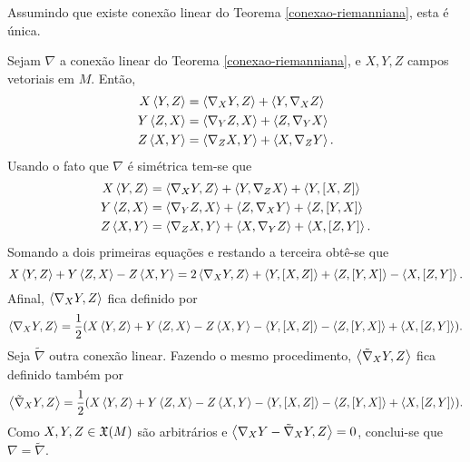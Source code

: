 \begin{lema}\label{conexao-riemanniana-lema-1}
	Assumindo que existe conexão linear do Teorema \ref{conexao-riemanniana}, esta é única.
\end{lema}

\begin{demonstracao}
	Sejam $\nabla$ a conexão linear do Teorema \ref{conexao-riemanniana}, e $X,Y,Z$ campos vetoriais em $M$. Então,
	\begin{align*}
		X \left\langle Y,Z \right\rangle &= \left\langle \nabla_X Y,Z \right\rangle + \left\langle Y,\nabla_X Z \right\rangle\\
		Y \left\langle Z,X \right\rangle &= \left\langle \nabla_Y Z,X \right\rangle + \left\langle Z,\nabla_Y X \right\rangle\\
		Z \left\langle X,Y \right\rangle &= \left\langle \nabla_Z X,Y \right\rangle + \left\langle X,\nabla_Z Y \right\rangle.
	\end{align*}
	Usando o fato que $\nabla$ é simétrica tem-se que
	\begin{align*}
	X \left\langle Y,Z \right\rangle &= \left\langle \nabla_X Y,Z \right\rangle + \left\langle Y,\nabla_Z X \right\rangle + \left\langle Y,\left[ X, Z \right] \right\rangle\\
	Y \left\langle Z,X \right\rangle &= \left\langle \nabla_Y Z,X \right\rangle + \left\langle Z,\nabla_X Y \right\rangle + \left\langle Z,\left[ Y, X \right] \right\rangle\\
	Z \left\langle X,Y \right\rangle &= \left\langle \nabla_Z X,Y \right\rangle + \left\langle X,\nabla_Y Z \right\rangle + \left\langle X,\left[ Z, Y \right] \right\rangle.
	\end{align*}
	Somando a dois primeiras equações e restando a terceira obtê-se que
	\begin{equation*}
		X \left\langle Y,Z \right\rangle + Y \left\langle Z,X \right\rangle - Z \left\langle X,Y \right\rangle = 2 \left\langle \nabla_X Y,Z \right\rangle + \left\langle Y,\left[ X, Z \right] \right\rangle + \left\langle Z,\left[ Y, X \right] \right\rangle - \left\langle X,\left[ Z, Y \right] \right\rangle.
	\end{equation*}
	Afinal, $\left\langle \nabla_X Y,Z \right\rangle$ fica definido por
	\begin{equation}\label{eq:conexao-riemanniana-lema-1-eq-a}
		\left\langle \nabla_X Y,Z \right\rangle = \frac{1}{2} ( X \left\langle Y,Z \right\rangle + Y \left\langle Z,X \right\rangle - Z \left\langle X,Y \right\rangle - \left\langle Y,\left[ X, Z \right] \right\rangle - \left\langle Z,\left[ Y, X \right] \right\rangle + \left\langle X,\left[ Z, Y \right] \right\rangle ).
	\end{equation}
	Seja $\tilde{\nabla}$ outra conexão linear. Fazendo o mesmo procedimento, $\left\langle \tilde{\nabla}_X Y,Z \right\rangle$ fica definido também por
	\begin{equation*}
	\left\langle \tilde{\nabla}_X Y,Z \right\rangle = \frac{1}{2} ( X \left\langle Y,Z \right\rangle + Y \left\langle Z,X \right\rangle - Z \left\langle X,Y \right\rangle - \left\langle Y,\left[ X, Z \right] \right\rangle - \left\langle Z,\left[ Y, X \right] \right\rangle + \left\langle X,\left[ Z, Y \right] \right\rangle ).
	\end{equation*}
	Como $X,Y,Z \in \mathfrak{X}(M)$ são arbitrários e $ \left\langle \nabla_X Y - \tilde{\nabla}_X Y,Z \right\rangle = 0 $, conclui-se que $ \nabla = \tilde{\nabla} $.
\end{demonstracao}


